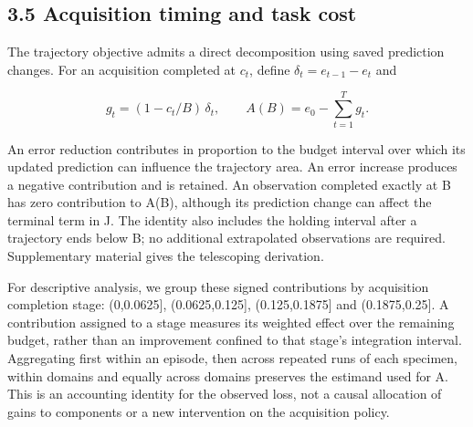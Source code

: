 \subsection{3.5 Acquisition timing and task cost}\label{acquisition-timing-and-task-cost}

The trajectory objective admits a direct decomposition using saved prediction changes. For an acquisition completed at \(c_t\), define \(\delta_t=e_{t-1}-e_t\) and

\[g_t=(1-c_t/B)\,\delta_t,\qquad A(B)=e_0-\sum_{t=1}^{T}g_t.\]

An error reduction contributes in proportion to the budget interval over which its updated prediction can influence the trajectory area. An error increase produces a negative contribution and is retained. An observation completed exactly at B has zero contribution to A(B), although its prediction change can affect the terminal term in J. The identity also includes the holding interval after a trajectory ends below B; no additional extrapolated observations are required. Supplementary material gives the telescoping derivation.

For descriptive analysis, we group these signed contributions by acquisition completion stage: (0,0.0625{]}, (0.0625,0.125{]}, (0.125,0.1875{]} and (0.1875,0.25{]}. A contribution assigned to a stage measures its weighted effect over the remaining budget, rather than an improvement confined to that stage's integration interval. Aggregating first within an episode, then across repeated runs of each specimen, within domains and equally across domains preserves the estimand used for A. This is an accounting identity for the observed loss, not a causal allocation of gains to components or a new intervention on the acquisition policy.
